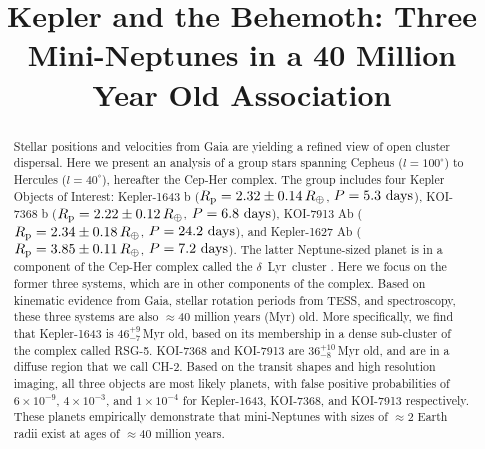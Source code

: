 \documentclass[12pt,twocolumn,linenumbers]{aastex63}
\begin{document}
\title{
  Kepler and the Behemoth: Three Mini-Neptunes in a 40 Million Year Old Association
}



\begin{abstract}
  Stellar positions and velocities from Gaia are yielding a 
  refined view of open cluster dispersal.
  Here we present an analysis of a group stars spanning Cepheus
  ($l=100^\circ$) to Hercules ($l=40^\circ$), hereafter the Cep-Her
  complex.
  The group includes four Kepler Objects of Interest:
  Kepler-1643 b ($R_{\rm p} = 2.32 \pm 0.14\,R_\oplus$, $P = 5.3\ {\rm days}$),
  KOI-7368 b ($R_{\rm p} = 2.22 \pm 0.12\,R_\oplus$, $P = 6.8\ {\rm days}$), 
  KOI-7913 Ab ($R_{\rm p} = 2.34 \pm 0.18\,R_\oplus$, $P = 24.2\ {\rm days}$), and
  Kepler-1627 Ab ($R_{\rm p} = 3.85 \pm 0.11\,R_\oplus$, $P = 7.2\ {\rm days}$).
  The latter Neptune-sized planet is in a component of the
  Cep-Her complex called the $\delta$\ Lyr\ cluster
  \citep{bouma_kep1627_2022}.
  Here we focus on the former three systems, which are in other
  components of the complex.
  Based on kinematic evidence from Gaia, stellar rotation periods from
  TESS, and spectroscopy, these three systems are also $\approx$40
  million years (Myr) old.
  More specifically, we find that Kepler-1643 is $46^{+9}_{-7}$\,Myr
  old, based on its membership in a dense
  sub-cluster of the complex called RSG-5.
  KOI-7368 and KOI-7913 are $36^{+10}_{-8}$\,Myr old, and are in a
  diffuse region that we call CH-2.
  Based on the transit shapes and high resolution imaging, all three
  objects are most likely planets, with false positive probabilities
  of $6\times10^{-9}$, $4\times10^{-3}$, and $1\times10^{-4}$ for
  Kepler-1643, KOI-7368, and KOI-7913 respectively.
  These planets empirically demonstrate that mini-Neptunes with sizes
  of $\approx$2 Earth radii exist at ages of $\approx$40 million
  years.
\end{abstract}




\end{document}
